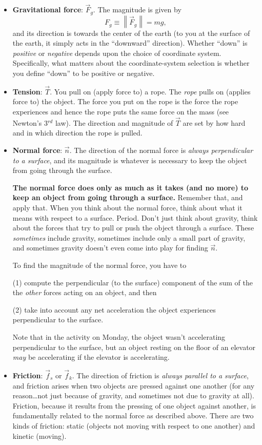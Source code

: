 \documentclass[10pt,letterpaper,twoside]{article}
\begin{document}
\begin{itemize}
	\item \textbf{Gravitational force}: $\vec F_g$.
	  The magnitude is given by $$F_g\equiv\left\lVert \vec F_g\right\rVert  = mg,$$ and its direction is towards the center of the earth (to you at the surface of the earth, it simply acts in the ``downward'' direction).
	  Whether ``down'' is \textit{positive} or \textit{negative} depends upon the choice of coordinate system.
	  Specifically, what matters about the coordinate-system selection is whether you define ``down'' to be positive or negative.
	\item \textbf{Tension}: $\vec T$.
	  You pull on (apply force to) a rope.
	  The \textit{rope} pulls on (applies force to) the object.
	  The force you put on the rope is the force the rope experiences and hence the rope puts the same force on the mass (see Newton's 3$^{rd}$ law).
	  The direction and magnitude of $\vec T$ are set by how hard and in which direction the rope is pulled.
	\item \textbf{Normal force}: $\vec{n}$.
	  The direction of the normal force is \textit{always perpendicular to a surface}, and its magnitude is whatever is necessary to keep the object from going through the surface.

	  \textbf{The normal force does only as much as it takes (and no more) to keep an object from going through a surface.} Remember that, and apply that.
	  When you think about the normal force, think about what it means with respect to a surface.
	  Period.
	  Don't just think about gravity, think about the forces that try to pull or push the object through a surface.
	  These \textit{sometimes} include gravity, sometimes include only a small part of gravity, and sometimes gravity doesn't even come into play for finding $\vec n$.

	  To find the magnitude of the normal force, you have to

	  (1) compute the perpendicular (to the surface) component of the sum of the the \textit{other} forces acting on an object, and then

	  (2) take into account any net acceleration the object experiences perpendicular to the surface.
	  
	  Note that in the activity on Monday, the object wasn't accelerating perpendicular to the surface, but an object resting on the floor of an elevator \textit{may} be accelerating if the elevator is accelerating.
	  
	\item \textbf{Friction}: $\vec f_s$ or $\vec f_k$.
	  The direction of friction is \textit{always parallel to a surface}, and friction arises when two objects are pressed against one another (for any reason\dots not just because of gravity, and sometimes not due to gravity at all).
	  Friction, because it results from the pressing of one object against another, is fundamentally related to the normal force as described above.
	  There are two kinds of friction: static (objects not moving with respect to one another) and kinetic (moving).


\end{itemize}
\end{document}
